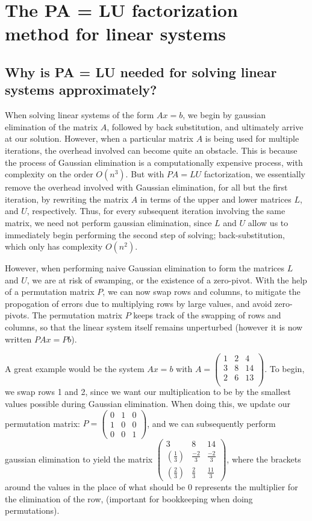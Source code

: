 \documentclass[11pt]{article}
\begin{document}
\section{The PA = LU factorization method for linear systems}

\subsection{Why is PA = LU needed for solving linear systems approximately?}

When solving linear systems of the form $Ax = b$, we begin by gaussian elimination of the matrix $A$, followed by back substitution, and ultimately arrive at our solution.
However, when a particular matrix $A$ is being used for multiple iterations, the overhead involved can become quite an obstacle.
This is because the process of Gaussian elimination is a computationally expensive process, with complexity on the order $O(n^3)$.
But with $PA = LU$ factorization, we essentially remove the overhead involved with Gaussian elimination, for all but the first iteration, by rewriting the matrix $A$ in terms of the upper and lower matrices $L$, and $U$, respectively.
Thus, for every subsequent iteration involving the same matrix, we need not perform gaussian elimination, since $L$ and $U$ allow us to immediately begin performing the second step of solving;
back-substitution, which only has complexity $O(n^2)$.

However, when performing naive Gaussian elimination to form the matrices $L$ and $U$, we are at risk of swamping, or the existence of a zero-pivot.
With the help of a permutation matrix $P$, we can now swap rows and columns, to mitigate the propogation of errors due to multiplying rows by large values, and avoid zero-pivots.
The permutation matrix $P$ keeps track of the swapping of rows and columns, so that the linear system itself remains unperturbed (however it is now written $PAx = Pb$).

A great example would be the system $Ax = b$  with $A = \begin{pmatrix}1 & 2 & 4\\3 & 8 & 14\\ 2 & 6 & 13\\
\end{pmatrix}$.
To begin, we swap rows 1 and 2, since we want our multiplication to be by the smallest values possible during Gaussian elimination.
When doing this, we update our permutation matrix: $P = \begin{pmatrix}0&1&0\\1&0&0\\0&0&1
\end{pmatrix}$, and we can subsequently perform gaussian elimination to yield the matrix $\begin{pmatrix}3&8&14\\(\frac{1}{3})&\frac{-2}{3}&\frac{-2}{3}\\(\frac{2}{3})&\frac{2}{3}&\frac{11}{3}
\end{pmatrix}$, where the brackets around the values in the place of what should be $0$ represents the multiplier for the elimination of the row, (important for bookkeeping when doing permutations).
\end{document}
